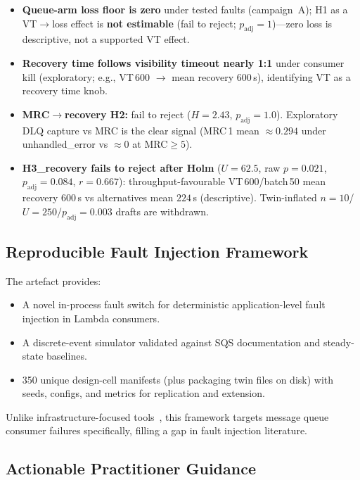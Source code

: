 \begin{itemize}
    \item \textbf{Queue-arm loss floor is zero} under tested faults (campaign~A); H1 as a VT$\rightarrow$loss effect is \textbf{not estimable} (fail to reject; $p_{\mathrm{adj}}=1$)---zero loss is descriptive, not a supported VT effect.
    \item \textbf{Recovery time follows visibility timeout nearly 1:1} under consumer kill (exploratory; e.g., VT\,600 $\rightarrow$ mean recovery $600$\,s), identifying VT as a recovery time knob.
    \item \textbf{MRC$\rightarrow$recovery H2:} fail to reject ($H=2.43$, $p_{\mathrm{adj}}=1.0$). Exploratory DLQ capture vs MRC is the clear signal (MRC\,1 mean $\approx0.294$ under unhandled\_error vs $\approx0$ at MRC$\ge5$).
    \item \textbf{H3\_recovery fails to reject after Holm} ($U=62.5$, raw $p=0.021$, $p_{\mathrm{adj}}=0.084$, $r=0.667$): throughput-favourable VT\,600/batch\,50 mean recovery $600$\,s vs alternatives mean $224$\,s (descriptive). Twin-inflated $n=10$/$U=250$/$p_{\mathrm{adj}}=0.003$ drafts are withdrawn.
\end{itemize}

\subsection{Reproducible Fault Injection Framework}

The artefact provides:
\begin{itemize}
    \item A novel in-process fault switch for deterministic application-level fault injection in Lambda consumers.
    \item A discrete-event simulator validated against SQS documentation and steady-state baselines.
    \item 350 unique design-cell manifests (plus packaging twin files on disk) with seeds, configs, and metrics for replication and extension.
\end{itemize}

Unlike infrastructure-focused tools~\citep{Gao2023CrashFuzz, Wu2024Legolas}, this framework targets message queue consumer failures specifically, filling a gap in fault injection literature.

\subsection{Actionable Practitioner Guidance}

